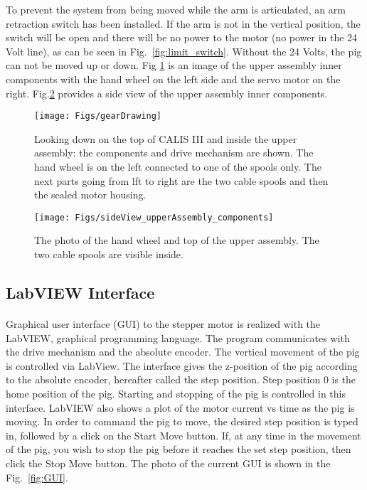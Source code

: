 To prevent the system from being moved while the arm is articulated, an arm retraction switch has been installed. If the arm is not in the vertical position, the switch will be open and there will be no power to the motor (no power in the 24 Volt line), as can be seen in Fig.~\ref{fig:limit_switch}.  Without the 24 Volts, the pig can not be moved up or down.  Fig \ref{fig:gearDrawing} is an image of the upper assembly inner components with the hand wheel on the left side and the servo motor on the right.  Fig.\ref{fig:sideView_upperAssembly_components} provides a side view of the upper assembly inner components.  
 
\begin{figure}[htbp]
 \centering
  \texttt{[image: Figs/gearDrawing]}
  \caption{Looking down on the top of CALIS III and inside the upper assembly: the components and drive mechanism are shown. The hand wheel is on the left connected to one of the spools only. The next parts going from lft to right are the two cable spools and then the sealed motor housing. }
  \label{fig:gearDrawing}
\end{figure}

\begin{figure}[htbp]
 \centering
  \texttt{[image: Figs/sideView\_upperAssembly\_components]}
  \caption{The photo of the hand wheel and top of the upper assembly. The two cable spools are visible inside.}
  \label{fig:sideView_upperAssembly_components}
\end{figure}
	
 \subsection{LabVIEW Interface} \label{LabView}
 \paragraph{}
 Graphical user  interface (GUI) to the stepper motor is realized with the LabVIEW, graphical programming language.  The program communicates with the drive mechanism and the absolute encoder.  The vertical movement of the pig is controlled via LabView.  The interface gives the z-position of the pig according to the absolute encoder, hereafter called the step position.  Step position 0 is the home position of the pig.  Starting and stopping of the pig is controlled in this interface.  LabVIEW also shows a plot of the motor current vs time as the pig is moving.  In order to command the pig to move, the desired step position is typed in, followed by a  click on the Start Move button. If, at any time in the movement of the pig, you wish to stop the pig before it reaches the set step position, then click the Stop Move button.   The photo of the current GUI is shown in the Fig.~\ref{fig:GUI}. 

